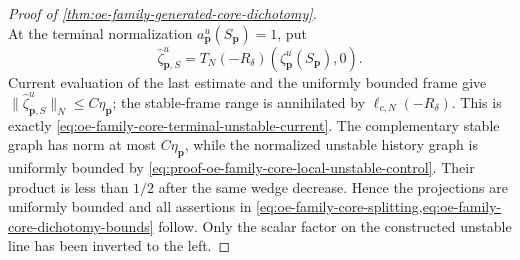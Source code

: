 \begin{proof}[Proof of
\cref{thm:oe-family-generated-core-dichotomy}]
\begin{equation}
\end{equation}
At the terminal normalization \(a_{\mathbf p}^u(S_{\mathbf p})=1\), put
\[
 \widehat\zeta_{\mathbf p,S}^u
 =T_N(-R_\delta)(\zeta_{\mathbf p}^u(S_{\mathbf p}),0).
\]
Current evaluation of the last estimate and the uniformly bounded frame
give \(\|\widehat\zeta_{\mathbf p,S}^u\|_N\le C\eta_{\mathbf p}\);
the stable-frame range is annihilated by
\(\ell_{c,N}(-R_\delta)\).  This is exactly
\cref{eq:oe-family-core-terminal-unstable-current}.  The complementary
stable graph has norm at most \(C\eta_{\mathbf p}\), while the normalized
unstable history graph is uniformly bounded by
\cref{eq:proof-oe-family-core-local-unstable-control}.  Their product is
less than \(1/2\) after the same wedge decrease.  Hence the projections are
uniformly bounded and all assertions in
\cref{eq:oe-family-core-splitting,eq:oe-family-core-dichotomy-bounds}
follow.  Only the scalar factor on the constructed unstable line has been
inverted to the left.
\end{proof}


